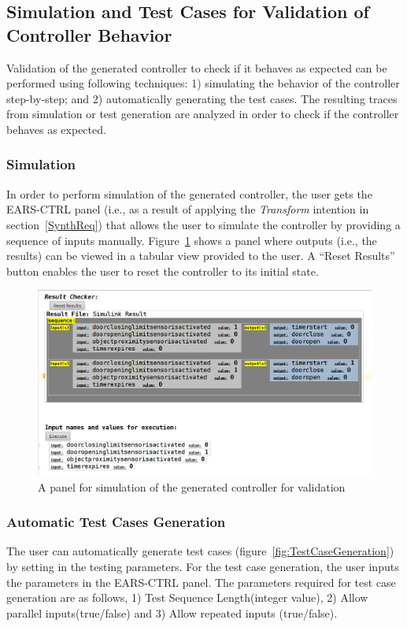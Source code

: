 \subsection{Simulation and Test Cases for Validation of Controller
Behavior}
\vspace{-.2cm}
Validation of the generated controller to check if it behaves as expected can be
performed using following techniques: 1) simulating the behavior of the
controller step-by-step; and 2) automatically generating the test cases.
The resulting traces from simulation or test generation are analyzed in order to
check if the controller behaves as expected.
\vspace{-.3cm}
\subsubsection{Simulation}
\vspace{-.2cm}
In order to perform simulation of the generated controller, the user gets the
\textsf{EARS-CTRL} panel (i.e., as a result of applying the \emph{Transform}
intention in section~\ref{SynthReq}) that allows the user to
simulate the controller by providing a sequence of inputs manually.
Figure~\ref{fig:SimulationSteps} shows a panel where outputs (i.e., the results)
can be viewed in a tabular view provided to the user. A \textsf{“Reset Results”}
button enables the user to reset the controller to its initial state. 
\begin{figure}[!h]
\centering
\includegraphics[width=.9\textwidth]{./images/simulation.png}
\caption{A panel for simulation of the generated controller for validation}
\label{fig:SimulationSteps}
\vspace{-.6cm}
\end{figure}
\subsubsection{Automatic Test Cases Generation} 
\vspace{-.5cm}
The user can automatically generate test cases
(figure~\ref{fig:TestCaseGeneration}) by setting in the testing parameters.
For the test case generation, the user inputs the
parameters in the \textsf{EARS-CTRL} panel.
The parameters required for test case generation are as follows, 1) \textsf{Test
Sequence Length(integer value)}, 2) \textsf{Allow parallel inputs(true/false)} and 3) \textsf{Allow repeated inputs (true/false)}.